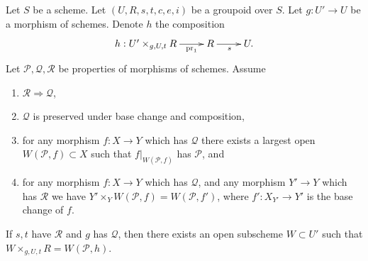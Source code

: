 \begin{lemma}
\label{lemma-local-source}
Let $S$ be a scheme.
Let $(U, R, s, t, c, e, i)$ be a groupoid over $S$.
Let $g : U' \to U$ be a morphism of schemes.
Denote $h$ the composition
$$
\xymatrix{
h : U' \times_{g, U, t} R \ar[r]_-{\text{pr}_1} & R \ar[r]_s & U.
}
$$
Let $\mathcal{P}, \mathcal{Q}, \mathcal{R}$ be properties of morphisms
of schemes. Assume
\begin{enumerate}
\item $\mathcal{R} \Rightarrow \mathcal{Q}$,
\item $\mathcal{Q}$ is preserved under base change and composition,
\item for any morphism $f : X \to Y$ which has $\mathcal{Q}$ there exists a
largest open $W(\mathcal{P}, f) \subset X$ such that $f|_{W(\mathcal{P}, f)}$
has $\mathcal{P}$, and
\item for any morphism $f : X \to Y$ which has $\mathcal{Q}$,
and any morphism $Y' \to Y$ which has $\mathcal{R}$ we have
$Y' \times_Y W(\mathcal{P}, f) = W(\mathcal{P}, f')$, where
$f' : X_{Y'} \to Y'$ is the base change of $f$.
\end{enumerate}
If $s,t$ have $\mathcal{R}$ and $g$ has $\mathcal{Q}$, then
there exists an open subscheme $W \subset U'$ such that
$W \times_{g, U, t} R = W(\mathcal{P}, h)$.
\end{lemma}

